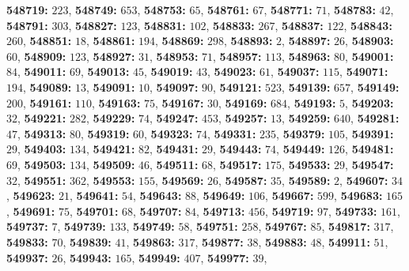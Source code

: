\textsf{\bfseries 548719:} $223$, \textsf{\bfseries 548749:} $653$, \textsf{\bfseries 548753:} $65$, \textsf{\bfseries 548761:} $67$, \textsf{\bfseries 548771:} $71$, \textsf{\bfseries 548783:} $42$, \textsf{\bfseries 548791:} $303$, \textsf{\bfseries 548827:} $123$, \textsf{\bfseries 548831:} $102$, \textsf{\bfseries 548833:} $267$, \textsf{\bfseries 548837:} $122$, \textsf{\bfseries 548843:} $260$, \textsf{\bfseries 548851:} $18$, \textsf{\bfseries 548861:} $194$, \textsf{\bfseries 548869:} $298$, \textsf{\bfseries 548893:} $2$, \textsf{\bfseries 548897:} $26$, \textsf{\bfseries 548903:} $60$, \textsf{\bfseries 548909:} $123$, \textsf{\bfseries 548927:} $31$, \textsf{\bfseries 548953:} $71$, \textsf{\bfseries 548957:} $113$, \textsf{\bfseries 548963:} $80$, \textsf{\bfseries 549001:} $84$, \textsf{\bfseries 549011:} $69$, \textsf{\bfseries 549013:} $45$, \textsf{\bfseries 549019:} $43$, \textsf{\bfseries 549023:} $61$, \textsf{\bfseries 549037:} $115$, \textsf{\bfseries 549071:} $194$, \textsf{\bfseries 549089:} $13$, \textsf{\bfseries 549091:} $10$, \textsf{\bfseries 549097:} $90$, \textsf{\bfseries 549121:} $523$, \textsf{\bfseries 549139:} $657$, \textsf{\bfseries 549149:} $200$, \textsf{\bfseries 549161:} $110$, \textsf{\bfseries 549163:} $75$, \textsf{\bfseries 549167:} $30$, \textsf{\bfseries 549169:} $684$, \textsf{\bfseries 549193:} $5$, \textsf{\bfseries 549203:} $32$, \textsf{\bfseries 549221:} $282$, \textsf{\bfseries 549229:} $74$, \textsf{\bfseries 549247:} $453$, \textsf{\bfseries 549257:} $13$, \textsf{\bfseries 549259:} $640$, \textsf{\bfseries 549281:} $47$, \textsf{\bfseries 549313:} $80$, \textsf{\bfseries 549319:} $60$, \textsf{\bfseries 549323:} $74$, \textsf{\bfseries 549331:} $235$, \textsf{\bfseries 549379:} $105$, \textsf{\bfseries 549391:} $29$, \textsf{\bfseries 549403:} $134$, \textsf{\bfseries 549421:} $82$, \textsf{\bfseries 549431:} $29$, \textsf{\bfseries 549443:} $74$, \textsf{\bfseries 549449:} $126$, \textsf{\bfseries 549481:} $69$, \textsf{\bfseries 549503:} $134$, \textsf{\bfseries 549509:} $46$, \textsf{\bfseries 549511:} $68$, \textsf{\bfseries 549517:} $175$, \textsf{\bfseries 549533:} $29$, \textsf{\bfseries 549547:} $32$, \textsf{\bfseries 549551:} $362$, \textsf{\bfseries 549553:} $155$, \textsf{\bfseries 549569:} $26$, \textsf{\bfseries 549587:} $35$, \textsf{\bfseries 549589:} $2$, \textsf{\bfseries 549607:} $34$, \textsf{\bfseries 549623:} $21$, \textsf{\bfseries 549641:} $54$, \textsf{\bfseries 549643:} $88$, \textsf{\bfseries 549649:} $106$, \textsf{\bfseries 549667:} $599$, \textsf{\bfseries 549683:} $165$, \textsf{\bfseries 549691:} $75$, \textsf{\bfseries 549701:} $68$, \textsf{\bfseries 549707:} $84$, \textsf{\bfseries 549713:} $456$, \textsf{\bfseries 549719:} $97$, \textsf{\bfseries 549733:} $161$, \textsf{\bfseries 549737:} $7$, \textsf{\bfseries 549739:} $133$, \textsf{\bfseries 549749:} $58$, \textsf{\bfseries 549751:} $258$, \textsf{\bfseries 549767:} $85$, \textsf{\bfseries 549817:} $317$, \textsf{\bfseries 549833:} $70$, \textsf{\bfseries 549839:} $41$, \textsf{\bfseries 549863:} $317$, \textsf{\bfseries 549877:} $38$, \textsf{\bfseries 549883:} $48$, \textsf{\bfseries 549911:} $51$, \textsf{\bfseries 549937:} $26$, \textsf{\bfseries 549943:} $165$, \textsf{\bfseries 549949:} $407$, \textsf{\bfseries 549977:} $39$, 
